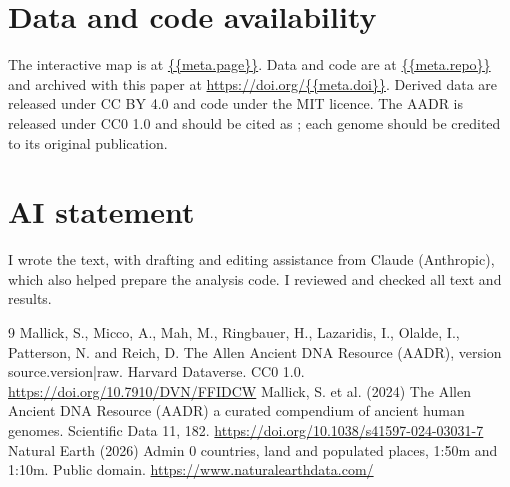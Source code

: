 \documentclass[11pt,a4paper]{article}
\begin{document}
\section*{Data and code availability}
The interactive map is at \url{{{meta.page}}}. Data and code are at \url{{{meta.repo}}} and archived with this paper at \url{https://doi.org/{{meta.doi}}}. Derived data are released under CC BY 4.0 and code under the MIT licence. The AADR is released under CC0 1.0 and should be cited as \citet{aadr,aadrpaper}; each genome should be credited to its original publication.

\section*{AI statement}
I wrote the text, with drafting and editing assistance from Claude (Anthropic), which also helped prepare the analysis code. I reviewed and checked all text and results.

\begin{thebibliography}{9}
 Mallick, S., Micco, A., Mah, M., Ringbauer, H., Lazaridis, I., Olalde, I., Patterson, N. and Reich, D. The Allen Ancient DNA Resource (AADR), version {{source.version|raw}}. Harvard Dataverse. CC0 1.0. \url{https://doi.org/10.7910/DVN/FFIDCW}
 Mallick, S. et al. (2024) The Allen Ancient DNA Resource (AADR) a curated compendium of ancient human genomes. Scientific Data 11, 182. \url{https://doi.org/10.1038/s41597-024-03031-7}
 Natural Earth (2026) Admin 0 countries, land and populated places, 1:50m and 1:10m. Public domain. \url{https://www.naturalearthdata.com/}
\end{thebibliography}
\end{document}
